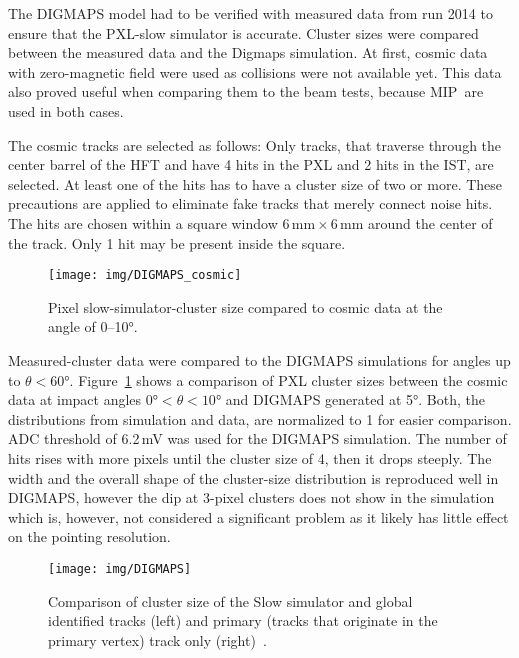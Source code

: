 The DIGMAPS model had to be verified with measured data from run 2014 to ensure that the PXL-slow simulator is accurate. Cluster sizes were compared between the measured data and the Digmaps simulation. At first, cosmic data with zero-magnetic field were used as collisions were not available yet. This data also proved useful when comparing them to the beam tests, because MIP\ are used in both cases.


The cosmic tracks are selected as follows: Only tracks, that traverse through the center barrel of the HFT and have 4 hits in the PXL and 2 hits in the IST, are selected. At least one of the hits has to have a cluster size of two or more. These precautions are applied to eliminate fake tracks that merely connect noise hits. The hits are chosen within a square window $6\,\mathrm{mm}\times6\,\mathrm{mm}$ around the center of the track. Only 1 hit may be present inside the square.


\begin{figure}[!htb]
\begin{center}
 \texttt{[image: img/DIGMAPS\_cosmic]}\\
\end{center}
\caption{\label{cosmicDigmaps}Pixel slow-simulator-cluster size compared to cosmic data at the angle of 0--10°.}
\end{figure}

Measured-cluster data were compared to the DIGMAPS simulations for angles up to $\theta < 60$°. Figure~\ref{cosmicDigmaps} shows a comparison of PXL cluster sizes between the cosmic data at impact angles $0\text{°} < \theta < 10$° and DIGMAPS generated at 5°\@. Both, the distributions from simulation and data, are normalized to 1 for easier comparison.  ADC threshold of 6.2$\,$mV was used for the DIGMAPS simulation. The number of hits rises with more pixels until the cluster size of 4, then it drops steeply. The width and the overall shape of the cluster-size distribution is reproduced well in DIGMAPS, however the dip at 3-pixel clusters does not show in the simulation which is, however, not considered a significant problem as it likely has little effect on the pointing resolution.

\begin{figure}[!htb]
\begin{center}
 \texttt{[image: img/DIGMAPS]}\\
\end{center}
\caption{\label{AuAuDigmaps}Comparison of cluster size of the Slow simulator and global identified tracks (left) and primary (tracks that originate in the primary vertex) track only
(right)~\cite{KubaVyzkumak}.}
\end{figure}

